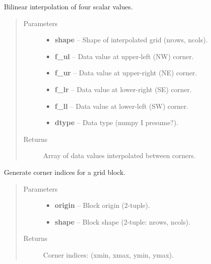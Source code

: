 \documentclass[letterpaper,10pt,english]{sphinxmanual}
\begin{document}
\begin{fulllineitems}
\label{docs/utilities:blrb.bilinear}
Bilinear interpolation of four scalar values.
\begin{quote}\begin{description}
\item[{Parameters}] \leavevmode\begin{itemize}
\item {} 
\textbf{shape} -- Shape of interpolated grid (nrows, ncols).

\item {} 
\textbf{f\_ul} -- Data value at upper-left (NW) corner.

\item {} 
\textbf{f\_ur} -- Data value at upper-right (NE) corner.

\item {} 
\textbf{f\_lr} -- Data value at lower-right (SE) corner.

\item {} 
\textbf{f\_ll} -- Data value at lower-left (SW) corner.

\item {} 
\textbf{dtype} -- Data type (numpy I presume?).

\end{itemize}

\item[{Returns}] \leavevmode
Array of data values interpolated between corners.

\end{description}\end{quote}

\end{fulllineitems}



\begin{fulllineitems}
\label{docs/utilities:blrb.indices}
Generate corner indices for a grid block.
\begin{quote}\begin{description}
\item[{Parameters}] \leavevmode\begin{itemize}
\item {} 
\textbf{origin} -- Block origin (2-tuple).

\item {} 
\textbf{shape} -- Block shape (2-tuple: nrows, ncols).

\end{itemize}

\item[{Returns}] \leavevmode
Corner indices: (xmin, xmax, ymin, ymax).

\end{description}\end{quote}

\end{fulllineitems}
\end{document}
